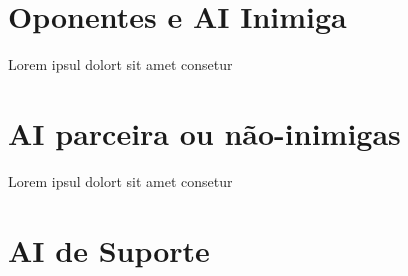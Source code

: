 
\section{Oponentes e AI Inimiga}

Lorem ipsul dolort sit amet consetur

\section{AI parceira ou não-inimigas}

Lorem ipsul dolort sit amet consetur

\section{AI de Suporte}
